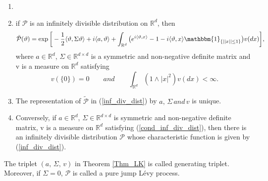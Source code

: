 \begin{theorem} \begin{enumerate}[label=(\roman*)]\label{Thm_LK}
    \item[]
    \item if $\mathcal{P}$ is an infinitely divisible distribution on $\mathbb{R}^d$, then
    \begin{equation}\label{inf_div_dist}
        \tilde{\mathcal{P}}(\vartheta) = \exp \bigg[-\frac{1}{2}\langle \vartheta, \Sigma \vartheta \rangle + i\langle a,\vartheta \rangle + \int_{\mathbb{R}^d} \big( e^{i\langle \vartheta,x \rangle } - 1 - {i\langle \vartheta,x \rangle } \mathbbm{1}_{\{||x||\leq1\}} \big) v(dx) \bigg],
    \end{equation}
    where $a \in \mathbb{R}^d$, $\Sigma \in \mathbb{R}^{d \times d}$ is a symmetric and non-negative definite matrix and v is a measure on $\mathbb{R}^d$ satisfying 
    \begin{equation}\label{cond_inf_div_dist}
        v(\{0\}) = 0 \qquad and \qquad \int_{\mathbb{R}^d} (1 \land |x|^2)  v(dx)< \infty.
    \end{equation}
    \item The representation of $\tilde{\mathcal{P}}$ in (\ref{inf_div_dist}) by $a, \, \Sigma \, and \, v$ is unique.
    \item Conversely, if $a \in \mathbb{R}^d$, $\Sigma \in \mathbb{R}^{d \times d}$ is symmetric and non-negative definite matrix, v is a measure on  $\mathbb{R}^d$ satisfying (\ref{cond_inf_div_dist}), then there is an infinitely divisible distribution $ \mathcal{P}$ whose characteristic function is given by (\ref{inf_div_dist}).
\end{enumerate}
\end{theorem}
\begin{definition}
The triplet $(a, \, \Sigma, \, v)$ in Theorem \ref{Thm_LK} is called generating triplet. Moreover, if $\Sigma = 0$, $\mathcal{P}$ is called a pure jump L\'evy process.
\end{definition}

